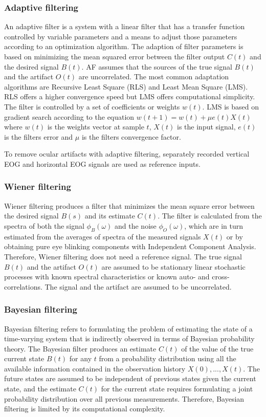 \documentclass[twoside]{article}
\begin{document}
\subsubsection{Adaptive filtering \cite{adaptivefilter} \cite{adaptivefilterocular} \cite{ieee} }
An adaptive filter is a system with a linear filter that has a transfer function controlled by variable parameters and a means to adjust those parameters according to an optimization algorithm. The adaption of filter parameters is based on minimizing the mean squared error between the filter output $C(t)$ and the desired signal $B(t)$. AF assumes that the sources of the true signal $B(t)$ and the artifact $O(t)$ are uncorrelated. The most common adaptation algorithms are Recursive Least Square (RLS) and Least Mean Square (LMS). RLS offers a higher convergence speed but LMS offers computational simplicity. The filter is controlled by a set of coefficients or weights $w(t)$. LMS is based on gradient search according to the equation $w(t+1) = w(t) + \mu e(t)X(t) $ where $w(t)$ is the weights vector at sample $t$, $X(t)$ is the input signal, $e(t)$ is the filters error and $\mu$ is the filters convergence factor.

To remove ocular artifacts with adaptive filtering, separately recorded vertical EOG and horizontal EOG signals are used as reference inputs. 


\subsubsection{Wiener filtering \cite{wiener} \cite{adaptivewiener} \cite{ieee} }
Wiener filtering produces a filter that minimizes the mean square error between the desired signal $B(s)$ and its estimate $C(t)$. The filter is calculated from the spectra of both the signal $\phi_{B}(\omega)$ and the noise $\phi_{O}(\omega)$, which are in turn estimated from the averages of spectra of the measured signals $X(t)$ or by obtaining pure eye blinking components with Independent Component Analysis. Therefore, Wiener filtering does not need a reference signal. The true signal $B(t)$ and the artifact $O(t)$ are assumed to be stationary linear stochastic processes with known spectral characteristics or known auto- and cross-correlations. The signal and the artifact are assumed to be uncorrelated. 


\subsubsection{Bayesian filtering \cite{bayesianfiltering} \cite{eegguidelines} \cite{ieee}}
Bayesian filtering refers to formulating the problem of estimating the state of a time-varying system that is indirectly observed in terms of Bayesian probability theory. The Bayesian filter produces an estimate $C(t)$ of the value of the true current state $B(t)$ for any $t$ from a probability distribution using all the available information contained in the observation history $X(0),...,X(t)$. The future states are assumed to be independent of previous states given the current state, and the estimate $C(t)$ for the current state requires formulating a joint probability distribution over all previous measurements. Therefore, Bayesian filtering is limited by its computational complexity. 
\end{document}
